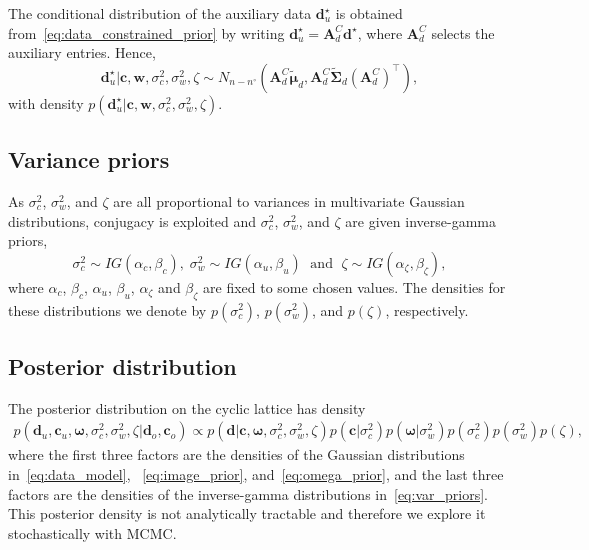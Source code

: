 \documentclass[12pt]{article}
\begin{document}
The conditional distribution of the auxiliary data $\bm{d}_u^{\star}$ is obtained from~\eqref{eq:data_constrained_prior} by writing $\bm{d}_u^{\star}=\bm{A}_d^C\bm{d}^{\star}$, where $\bm{A}_d^C$ selects the auxiliary entries. Hence,
\begin{equation}\label{eq:d_u_star_distribution}
    \bm{d}_u^{\star} | \bm{c},\bm{w},\sigma_c^2,\sigma_w^2,\zeta \sim N_{n - n^{\circ}}(\bm{A}_d^C \tilde{\bm{\mu}}_d, \bm{A}_d^C \tilde{\bm{\Sigma}}_{d}(\bm{A}_d^C)^{\top}),
\end{equation}
with density $p(\bm{d}_u^{\star} | \bm{c},\bm{w},\sigma_c^2,\sigma_w^2,\zeta)$. 

\subsection{Variance priors} \label{sec:hyperpriors}\label{sec:hyperpars_model}
As $\sigma_c^2$, $\sigma_w^2$, and $\zeta$ are all proportional to variances in multivariate Gaussian distributions, conjugacy is exploited and $\sigma_c^2$, $\sigma_w^2$, and $\zeta$ are given inverse-gamma priors,
\begin{equation} \label{eq:var_priors}
    \sigma_c^2 \sim IG(\alpha_c, \beta_c), \; 
    \sigma_w^2 \sim IG(\alpha_u, \beta_u) \; \mbox{~and~} \;
    \zeta \sim IG(\alpha_{\zeta}, \beta_{\zeta}),
\end{equation} 
where $\alpha_c$, $\beta_c$, $\alpha_u$, $\beta_u$, $\alpha_\zeta$ and $\beta_\zeta$ are fixed to some chosen values.
The densities for these distributions we denote by $p(\sigma_c^2)$, $p(\sigma_w^2)$, and $p(\zeta)$, respectively. 

\subsection{Posterior distribution}\label{sec:posterior}
The posterior distribution on the cyclic lattice has density
\begin{align} \label{eq:posterior_cyclic}
p(\bm{d}_u, \bm{c}_u, \bm{\omega}, \sigma_c^2, \sigma_w^2, \zeta | \bm{d}_o, \bm{c}_o) \propto p(\bm{d}|\bm{c}, \bm{\omega}, \sigma_c^2, \sigma_{w}^2, \zeta) p(\bm{c}| \sigma_c^2) p(\bm{\omega}|\sigma_{w}^2) p(\sigma_c^2) p(\sigma_{w}^2) p(\zeta),
\end{align}
where the first three factors are the densities of the Gaussian distributions in~\eqref{eq:data_model}, ~\eqref{eq:image_prior}, and~\eqref{eq:omega_prior}, and the last three factors are the densities of the inverse-gamma distributions in~\eqref{eq:var_priors}. This posterior density is not analytically tractable and therefore we explore it stochastically with MCMC.
\end{document}

